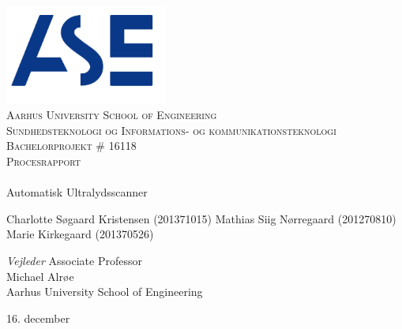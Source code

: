 \begin{titlingpage}
\begin{center}

~ \\[3cm]

\includegraphics[width=0.4\textwidth]{figurer/ASE}~\\[1cm]

\textsc{\LARGE Aarhus University School of Engineering}\\[1.5cm]

\textsc{\Large Sundhedsteknologi og Informations- og kommunikationsteknologi}\\ [0.33cm]
\textsc{\Large Bachelorprojekt \# 16118}\\[0.33cm]
\textsc{\LARGE Procesrapport} \\[1cm]

\noindent\makebox[\linewidth]{\rule{\textwidth}{0.4pt}}\\
[0.5cm]{\Huge Automatisk Ultralydsscanner}
\noindent\makebox[\linewidth]{\rule{\textwidth}{0.4pt}}

\end{center}
Charlotte Søgaard Kristensen (201371015) \newline
Mathias Siig Nørregaard  (201270810)\newline		 
Marie Kirkegaard (201370526) \newline  

\textit{Vejleder} \newline
Associate Professor\\
Michael Alrøe\\
Aarhus University School of Engineering


\vfill

\begin{center}
{\large 16. december}
\end{center}
\end{titlingpage}
\nopartblankpage

